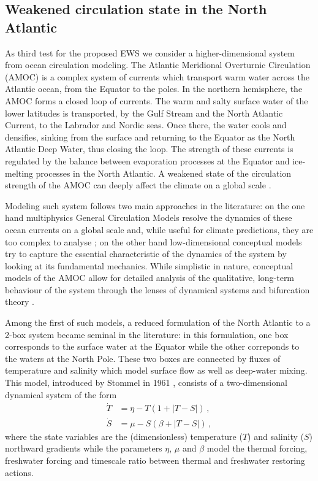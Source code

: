 \documentclass[10pt]{article}
\begin{document}
\subsection{Weakened circulation state in the North Atlantic}\label{subsec:AMOC}
As third test for the proposed EWS we consider a higher-dimensional system from ocean circulation modeling.
The Atlantic Meridional Overturnic Circulation (AMOC) is a complex system of currents which transport warm water across the Atlantic ocean, from the Equator to the poles.
In the northern hemisphere, the AMOC forms a closed loop of currents.
The warm and salty surface water of the lower latitudes is transported, by the Gulf Stream and the North Atlantic Current, to the Labrador and Nordic seas.
Once there, the water cools and densifies, sinking from the surface and returning to the Equator as the North Atlantic Deep Water, thus closing the loop.
The strength of these currents is regulated by the balance between evaporation processes at the Equator and ice-melting processes in the North Atlantic. 
A weakened state of the circulation strength of the AMOC can deeply affect the climate on a global scale \cite{Sutton2012,vanWesten025b,Dijkstra2026}.

Modeling such system follows two main approaches in the literature: on the one hand multiphysics General Circulation Models resolve the dynamics of these ocean currents on a global scale and, while useful for climate predictions, they are too complex to analyse \cite{vanWesten2023,vanWesten025a}; on the other hand low-dimensional conceptual models try to capture the essential characteristic of the dynamics of the system by looking at its fundamental mechanics.
While simplistic in nature, conceptual models of the AMOC allow for detailed analysis of the qualitative, long-term behaviour of the system through the lenses of dynamical systems and bifurcation theory \cite{Alkhayuon2019,Mancini2026}.

Among the first of such models, a reduced formulation of the North Atlantic to a 2-box system became seminal in the literature: in this formulation, one box corresponds to the surface water at the Equator while the other correponds to the waters at the North Pole.
These two boxes are connected by fluxes of temperature and salinity which model surface flow as well as deep-water mixing.
This model, introduced by Stommel in 1961 \cite{Stommel1961}, consists of a two-dimensional dynamical system of the form
%
\begin{equation}
        \begin{aligned}\label{eq:stommel_model}
                \dot{T} &= \eta - T(1 + |T-S|)\,,\\
                \dot{S} &= \mu - S(\beta + |T-S|)\,,
        \end{aligned}
\end{equation}
%
where the state variables are the (dimensionless) temperature ($T$) and salinity ($S$) northward gradients while the parameters $\eta$, $\mu$ and $\beta$ model the thermal forcing, freshwater forcing and timescale ratio between thermal and freshwater restoring actions.
\end{document}
